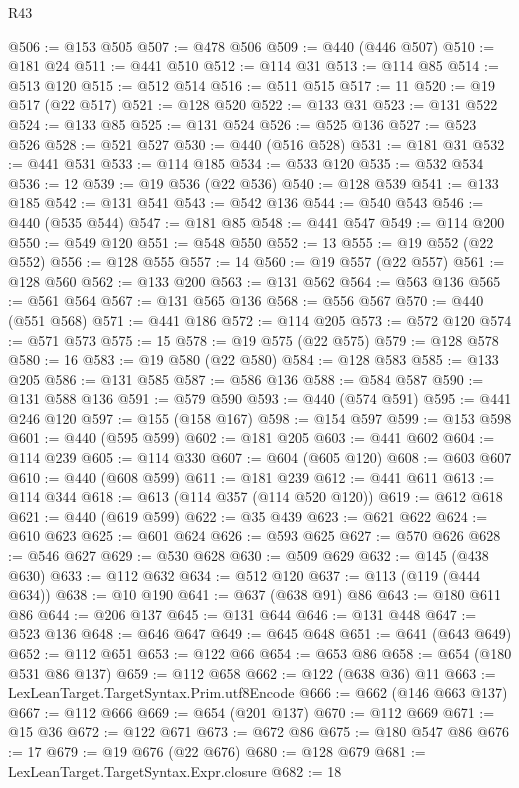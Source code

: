\begin{lexlean}{R43}
\begin{coremodule}
@506 := @153 @505
@507 := @478 @506
@509 := @440 (@446 @507)
@510 := @181 @24
@511 := @441 @510
@512 := @114 @31
@513 := @114 @85
@514 := @513 @120
@515 := @512 @514
@516 := @511 @515
@517 := 11
@520 := @19 @517 (@22 @517)
@521 := @128 @520
@522 := @133 @31
@523 := @131 @522
@524 := @133 @85
@525 := @131 @524
@526 := @525 @136
@527 := @523 @526
@528 := @521 @527
@530 := @440 (@516 @528)
@531 := @181 @31
@532 := @441 @531
@533 := @114 @185
@534 := @533 @120
@535 := @532 @534
@536 := 12
@539 := @19 @536 (@22 @536)
@540 := @128 @539
@541 := @133 @185
@542 := @131 @541
@543 := @542 @136
@544 := @540 @543
@546 := @440 (@535 @544)
@547 := @181 @85
@548 := @441 @547
@549 := @114 @200
@550 := @549 @120
@551 := @548 @550
@552 := 13
@555 := @19 @552 (@22 @552)
@556 := @128 @555
@557 := 14
@560 := @19 @557 (@22 @557)
@561 := @128 @560
@562 := @133 @200
@563 := @131 @562
@564 := @563 @136
@565 := @561 @564
@567 := @131 @565 @136
@568 := @556 @567
@570 := @440 (@551 @568)
@571 := @441 @186
@572 := @114 @205
@573 := @572 @120
@574 := @571 @573
@575 := 15
@578 := @19 @575 (@22 @575)
@579 := @128 @578
@580 := 16
@583 := @19 @580 (@22 @580)
@584 := @128 @583
@585 := @133 @205
@586 := @131 @585
@587 := @586 @136
@588 := @584 @587
@590 := @131 @588 @136
@591 := @579 @590
@593 := @440 (@574 @591)
@595 := @441 @246 @120
@597 := @155 (@158 @167)
@598 := @154 @597
@599 := @153 @598
@601 := @440 (@595 @599)
@602 := @181 @205
@603 := @441 @602
@604 := @114 @239
@605 := @114 @330
@607 := @604 (@605 @120)
@608 := @603 @607
@610 := @440 (@608 @599)
@611 := @181 @239
@612 := @441 @611
@613 := @114 @344
@618 := @613 (@114 @357 (@114 @520 @120))
@619 := @612 @618
@621 := @440 (@619 @599)
@622 := @35 @439
@623 := @621 @622
@624 := @610 @623
@625 := @601 @624
@626 := @593 @625
@627 := @570 @626
@628 := @546 @627
@629 := @530 @628
@630 := @509 @629
@632 := @145 (@438 @630)
@633 := @112 @632
@634 := @512 @120
@637 := @113 (@119 (@444 @634))
@638 := @10 @190
@641 := @637 (@638 @91) @86
@643 := @180 @611 @86
@644 := @206 @137
@645 := @131 @644
@646 := @131 @448
@647 := @523 @136
@648 := @646 @647
@649 := @645 @648
@651 := @641 (@643 @649)
@652 := @112 @651
@653 := @122 @66
@654 := @653 @86
@658 := @654 (@180 @531 @86 @137)
@659 := @112 @658
@662 := @122 (@638 @36) @11
@663 := LexLeanTarget.TargetSyntax.Prim.utf8Encode
@666 := @662 (@146 @663 @137)
@667 := @112 @666
@669 := @654 (@201 @137)
@670 := @112 @669
@671 := @15 @36
@672 := @122 @671
@673 := @672 @86
@675 := @180 @547 @86
@676 := 17
@679 := @19 @676 (@22 @676)
@680 := @128 @679
@681 := LexLeanTarget.TargetSyntax.Expr.closure
@682 := 18

\end{coremodule}
\end{lexlean}
